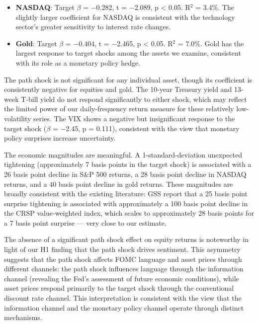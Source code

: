 \documentclass[12pt]{article}
\begin{document}
\begin{itemize}
\item \textbf{NASDAQ}: Target $\beta$ = $-$0.282, t = $-$2.089, p < 0.05. R$^2$ = 3.4\%. The slightly larger coefficient for NASDAQ is consistent with the technology sector's greater sensitivity to interest rate changes.
\end{itemize}

\begin{itemize}
\item \textbf{Gold}: Target $\beta$ = $-$0.404, t = $-$2.465, p < 0.05. R$^2$ = 7.0\%. Gold has the largest response to target shocks among the assets we examine, consistent with its role as a monetary policy hedge.
\end{itemize}

The path shock is not significant for any individual asset, though its coefficient is consistently negative for equities and gold. The 10-year Treasury yield and 13-week T-bill yield do not respond significantly to either shock, which may reflect the limited power of our daily-frequency return measure for these relatively low-volatility series. The VIX shows a negative but insignificant response to the target shock ($\beta$ = $-$2.45, p = 0.111), consistent with the view that monetary policy surprises increase uncertainty.

The economic magnitudes are meaningful. A 1-standard-deviation unexpected tightening (approximately 7 basis points in the target shock) is associated with a 26 basis point decline in S\&P 500 returns, a 28 basis point decline in NASDAQ returns, and a 40 basis point decline in gold returns. These magnitudes are broadly consistent with the existing literature: GSS report that a 25 basis point surprise tightening is associated with approximately a 100 basis point decline in the CRSP value-weighted index, which scales to approximately 28 basis points for a 7 basis point surprise --- very close to our estimate.

The absence of a significant path shock effect on equity returns is noteworthy in light of our H1 finding that the path shock drives sentiment. This asymmetry suggests that the path shock affects FOMC language and asset prices through different channels: the path shock influences language through the information channel (revealing the Fed's assessment of future economic conditions), while asset prices respond primarily to the target shock through the conventional discount rate channel. This interpretation is consistent with the view that the information channel and the monetary policy channel operate through distinct mechanisms.
\end{document}
